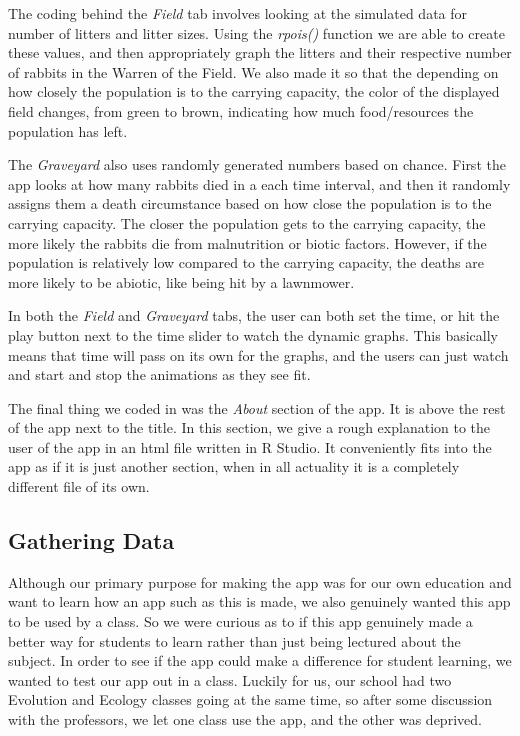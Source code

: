 \documentclass{article}\usepackage[]{graphicx}\usepackage[]{color}
\begin{document}
The coding behind the \textit{Field} tab involves looking at the simulated data for number of litters and litter sizes. Using the \textit{rpois()} function we are able to create these values, and then appropriately graph the litters and their respective number of rabbits in the Warren of the Field. We also made it so that the depending on how closely the population is to the carrying capacity, the color of the displayed field changes, from green to brown, indicating how much food/resources the population has left. 

The \textit{Graveyard} also uses randomly generated numbers based on chance. First the app looks at how many rabbits died in a each time interval, and then it randomly assigns them a death circumstance based on how close the population is to the carrying capacity. The closer the population gets to the carrying capacity, the more likely the rabbits die from malnutrition or biotic factors. However, if the population is relatively low compared to the carrying capacity, the deaths are more likely to be abiotic, like being hit by a lawnmower. 

In both the \textit{Field} and \textit{Graveyard} tabs, the user can both set the time, or hit the play button next to the time slider to watch the dynamic graphs. This basically means that time will pass on its own for the graphs, and the users can just watch and start and stop the animations as they see fit. 

The final thing we coded in was the \textit{About} section of the app. It is above the rest of the app next to the title. In this section, we give a rough explanation to the user of the app in an html file written in R Studio. It conveniently fits into the app as if it is just another section, when in all actuality it is a completely different file of its own. 









\subsection{Gathering Data}

Although our primary purpose for making the app was for our own education and want to learn how an app such as this is made, we also genuinely wanted this app to be used by a class. So we were curious as to if this app genuinely made a better way for students to learn rather than just being lectured about the subject. In order to see if the app could make a difference for student learning, we wanted to test our app out in a class. Luckily for us, our school had two Evolution and Ecology classes going at the same time, so after some discussion with the professors, we let one class use the app, and the other was deprived. 
\end{document}
